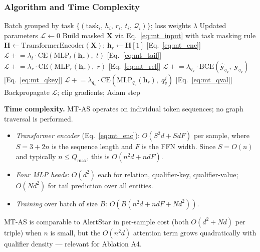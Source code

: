 \documentclass[10pt,journal,compsoc]{IEEEtran}
\begin{document}
\subsubsection{Algorithm and Time Complexity}
\label{sssec:mtas_complexity}

\begin{algorithm}[t]
\caption{MT-AlertStar: Training Step}
\label{alg:mtas}
\begin{algorithmic}[1]
\Require Batch grouped by task
  $\{(\mathrm{task}_i,\, h_i,\, r_i,\, t_i,\,
  \mathcal{Q}_i)\}$;
  loss weights $\lambda$
\Ensure Updated parameters
\State $\mathcal{L} \leftarrow 0$
  \State Build masked $\mathbf{X}$ via
    Eq.~\ref{eq:mt_input} with task masking rule
  \State $\mathbf{H} \leftarrow
    \mathrm{TransformerEncoder}(\mathbf{X})$;\;
    $\mathbf{h}_r \leftarrow \mathbf{H}[1]$
    \hfill [Eq.~\ref{eq:mt_enc}]
    \State $\mathcal{L} \mathrel{+}= \lambda_t \cdot
      \mathrm{CE}(\mathrm{MLP}_t(\mathbf{h}_r),\; t)$
      \hfill [Eq.~\ref{eq:mt_tail}]
    \State $\mathcal{L} \mathrel{+}= \lambda_r \cdot
      \mathrm{CE}(\mathrm{MLP}_r(\mathbf{h}_r),\; r)$
      \hfill [Eq.~\ref{eq:mt_rel}]
    \State $\mathcal{L} \mathrel{+}= \lambda_{q_k} \cdot
      \mathrm{BCE}(\hat{\mathbf{y}}_{q_k},\;
      \mathbf{y}_{q_k})$
      \hfill [Eq.~\ref{eq:mt_qkey}]
    \State $\mathcal{L} \mathrel{+}= \lambda_{q_v} \cdot
      \mathrm{CE}(\mathrm{MLP}_{q_v}(\mathbf{h}_r),\;
      q_v^j)$
      \hfill [Eq.~\ref{eq:mt_qval}]
  \EndIf
\EndFor
\State Backpropagate $\mathcal{L}$;\;
  clip gradients;\; Adam step
\end{algorithmic}
\end{algorithm}

\noindent\textbf{Time complexity.}
MT-AS operates on individual token sequences; no graph
traversal is performed.
\begin{itemize}
  \item \emph{Transformer encoder}
    (Eq.~\ref{eq:mt_enc}):
    $O(S^2 d + S d F)$ per sample, where
    $S = 3 + 2n$ is the sequence length and
    $F$ is the FFN width.
    Since $S = O(n)$ and typically $n \leq Q_{\max}$,
    this is $O(n^2 d + n d F)$.
  \item \emph{Four MLP heads}:
    $O(d^2)$ each for relation, qualifier-key,
    qualifier-value; $O(N d^2)$ for tail prediction
    over all entities.
  \item \emph{Training} over batch of size $B$:
    $O(B(n^2 d + n d F + N d^2))$.
\end{itemize}
MT-AS is comparable to AlertStar in per-sample cost
(both $O(d^2 + Nd)$ per triple) when $n$ is small,
but the $O(n^2 d)$ attention term grows quadratically
with qualifier density — relevant for Ablation A4.
\end{document}
